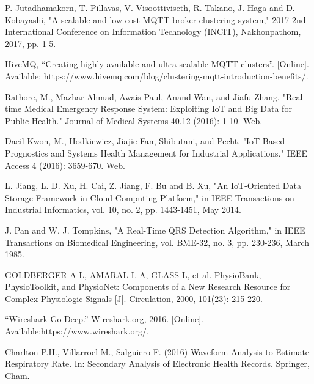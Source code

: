 \documentclass[conference]{IEEEtran}
\begin{document}
\begin{thebibliography}{00}
 P. Jutadhamakorn, T. Pillavas, V. Visoottiviseth, R. Takano, J. Haga and D. Kobayashi, "A scalable and low-cost MQTT broker clustering system," 2017 2nd International Conference on Information Technology (INCIT), Nakhonpathom, 2017, pp. 1-5.

HiveMQ, “Creating highly available and ultra-scalable MQTT clusters”. [Online]. Available: https://www.hivemq.com/blog/clustering-mqtt-introduction-benefits/.


 Rathore, M., Mazhar Ahmad, Awais Paul, Anand Wan, and Jiafu Zhang. "Real-time Medical Emergency Response System: Exploiting IoT and Big Data for Public Health." Journal of Medical Systems 40.12 (2016): 1-10. Web.

 Daeil Kwon, M., Hodkiewicz, Jiajie Fan, Shibutani, and Pecht. "IoT-Based Prognostics and Systems Health Management for Industrial Applications." IEEE Access 4 (2016): 3659-670. Web.

 L. Jiang, L. D. Xu, H. Cai, Z. Jiang, F. Bu and B. Xu, "An IoT-Oriented Data Storage Framework in Cloud Computing Platform," in IEEE Transactions on Industrial Informatics, vol. 10, no. 2, pp. 1443-1451, May 2014.

 J. Pan and W. J. Tompkins, "A Real-Time QRS Detection Algorithm," in IEEE Transactions on Biomedical Engineering, vol. BME-32, no. 3, pp. 230-236, March 1985.

 GOLDBERGER A L, AMARAL L A, GLASS L, et al. PhysioBank, PhysioToolkit, and PhysioNet: Components of a New
Research Resource for Complex Physiologic Signals [J]. Circulation, 2000, 101(23): 215-220.

 “Wireshark Go Deep.” Wireshark.org, 2016. [Online]. Available:https://www.wireshark.org/.

 Charlton P.H., Villarroel M., Salguiero F. (2016) Waveform Analysis to Estimate Respiratory Rate. In: Secondary Analysis of Electronic Health Records. Springer, Cham.


\end{thebibliography}

\end{document}
